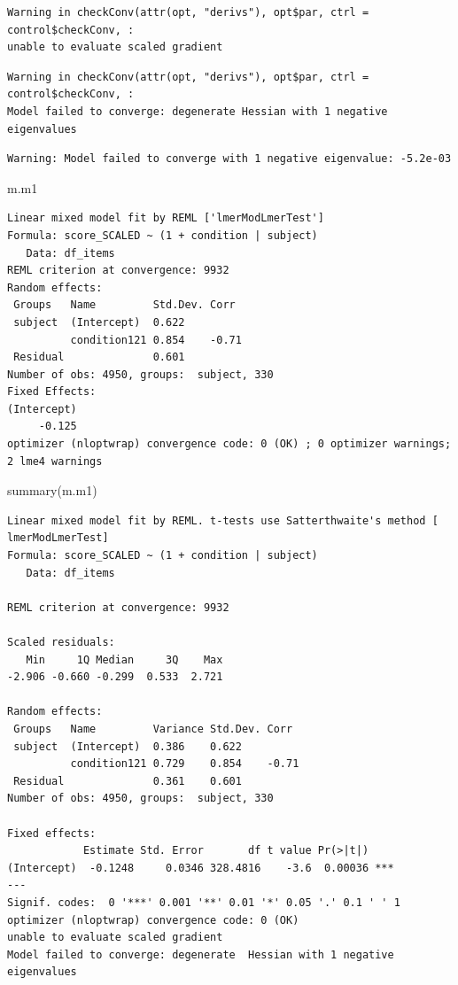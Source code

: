 \documentclass[
  letterpaper,
  DIV=11,
  numbers=noendperiod]{scrreprt}
\newenvironment{Shaded}{\begin{snugshade}}{\end{snugshade}}
\newcommand{\FunctionTok}[1]{\textcolor[rgb]{0.28,0.35,0.67}{#1}}
\newcommand{\NormalTok}[1]{\textcolor[rgb]{0.00,0.23,0.31}{#1}}
\begin{document}
\begin{verbatim}
Warning in checkConv(attr(opt, "derivs"), opt$par, ctrl = control$checkConv, :
unable to evaluate scaled gradient
\end{verbatim}

\begin{verbatim}
Warning in checkConv(attr(opt, "derivs"), opt$par, ctrl = control$checkConv, :
Model failed to converge: degenerate Hessian with 1 negative eigenvalues
\end{verbatim}

\begin{verbatim}
Warning: Model failed to converge with 1 negative eigenvalue: -5.2e-03
\end{verbatim}

\begin{Shaded}
\begin{Highlighting}[]
\NormalTok{m.m1}
\end{Highlighting}
\end{Shaded}

\begin{verbatim}
Linear mixed model fit by REML ['lmerModLmerTest']
Formula: score_SCALED ~ (1 + condition | subject)
   Data: df_items
REML criterion at convergence: 9932
Random effects:
 Groups   Name         Std.Dev. Corr 
 subject  (Intercept)  0.622         
          condition121 0.854    -0.71
 Residual              0.601         
Number of obs: 4950, groups:  subject, 330
Fixed Effects:
(Intercept)  
     -0.125  
optimizer (nloptwrap) convergence code: 0 (OK) ; 0 optimizer warnings; 2 lme4 warnings 
\end{verbatim}

\begin{Shaded}
\begin{Highlighting}[]
\FunctionTok{summary}\NormalTok{(m.m1)}
\end{Highlighting}
\end{Shaded}

\begin{verbatim}
Linear mixed model fit by REML. t-tests use Satterthwaite's method [
lmerModLmerTest]
Formula: score_SCALED ~ (1 + condition | subject)
   Data: df_items

REML criterion at convergence: 9932

Scaled residuals: 
   Min     1Q Median     3Q    Max 
-2.906 -0.660 -0.299  0.533  2.721 

Random effects:
 Groups   Name         Variance Std.Dev. Corr 
 subject  (Intercept)  0.386    0.622         
          condition121 0.729    0.854    -0.71
 Residual              0.361    0.601         
Number of obs: 4950, groups:  subject, 330

Fixed effects:
            Estimate Std. Error       df t value Pr(>|t|)    
(Intercept)  -0.1248     0.0346 328.4816    -3.6  0.00036 ***
---
Signif. codes:  0 '***' 0.001 '**' 0.01 '*' 0.05 '.' 0.1 ' ' 1
optimizer (nloptwrap) convergence code: 0 (OK)
unable to evaluate scaled gradient
Model failed to converge: degenerate  Hessian with 1 negative eigenvalues
\end{verbatim}
\end{document}
